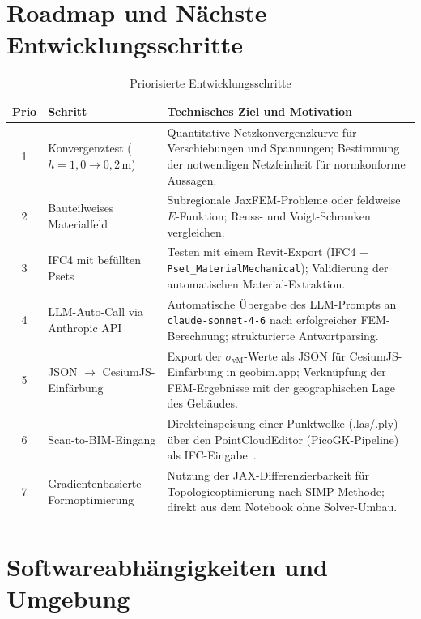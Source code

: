 \documentclass[a4paper,11pt]{article}
\begin{document}
\section{Roadmap und Nächste Entwicklungsschritte}
\label{sec:roadmap}

\begin{table}[H]
\centering
\caption{Priorisierte Entwicklungsschritte}
\begin{tabular}{cp{4.5cm}p{8cm}}
\toprule
\textbf{Prio} & \textbf{Schritt} & \textbf{Technisches Ziel und Motivation} \\
\midrule
1 & Konvergenztest ($h = 1{,}0 \to 0{,}2$\,m) & Quantitative Netzkonvergenzkurve für Verschiebungen und Spannungen; Bestimmung der notwendigen Netzfeinheit für normkonforme Aussagen. \\
2 & Bauteilweises Materialfeld & Subregionale JaxFEM-Probleme oder feldweise $E$-Funktion; Reuss- und Voigt-Schranken vergleichen. \\
3 & IFC4 mit befüllten Psets & Testen mit einem Revit-Export (IFC4 + \texttt{Pset\_MaterialMechanical}); Validierung der automatischen Material-Extraktion. \\
4 & LLM-Auto-Call via Anthropic API & Automatische Übergabe des LLM-Prompts an \texttt{claude-sonnet-4-6} nach erfolgreicher FEM-Berechnung; strukturierte Antwortparsing. \\
5 & JSON $\to$ CesiumJS-Einfärbung & Export der $\sigma_\text{vM}$-Werte als JSON für CesiumJS-Einfärbung in geobim.app; Verknüpfung der FEM-Ergebnisse mit der geographischen Lage des Gebäudes. \\
6 & Scan-to-BIM-Eingang & Direkteinspeisung einer Punktwolke (.las/.ply) über den PointCloudEditor (PicoGK-Pipeline) als IFC-Eingabe~\cite{chen2026scan, mahmoud2026scan}. \\
7 & Gradientenbasierte Formoptimierung & Nutzung der JAX-Differenzierbarkeit für Topologieoptimierung nach SIMP-Methode; direkt aus dem Notebook ohne Solver-Umbau. \\
\bottomrule
\end{tabular}
\end{table}

\section{Softwareabhängigkeiten und Umgebung}
\end{document}
